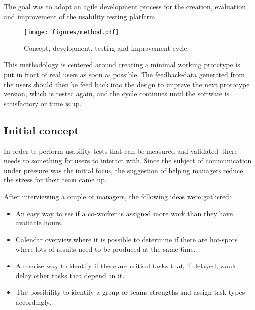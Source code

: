 \documentclass[nofilelist,dvipsnames]{cslthse-msc}
\begin{document}
        The goal was to adopt an agile development process{\findref} for the
        creation, evaluation and improvement of the usability testing platform.

        \begin{figure}[h!]
          \centering
          \texttt{[image: figures/method.pdf]}
          \caption{Concept, development, testing and improvement cycle.}
        \end{figure}

        This methodology is centered around creating a minimal
        working prototype{\findref} is put in front of real users as soon as
        possible. The feedback-data generated from the users should then be
        feed back into the design to improve the next prototype version, which
        is tested again, and the cycle continues until the software is
        satisfactory or time is up.


      \subsection{Initial concept}

        In order to perform usability tests that can be measured and validated,
        there needs to something for users to interact with. Since the subject
        of communication under pressure was the initial focus, the suggestion
        of helping managers reduce the stress for their team came up.

        After interviewing a couple of managers, the following ideas were
        gathered:

        \begin{itemize}
          \item{
            An easy way to see if a co-worker is assigned more work than they
            have available hours.
          }
          \item{
            Calendar overview where it is possible to determine if there are
            hot-spots where lots of results need to be produced at the same
            time.
          }
          \item{
            A concise way to identify if there are critical tasks that, if
            delayed, would delay other tasks that depend on it.
          }
          \item{
            The possibility to identify a group or teams strengths and assign
            task types accordingly.
          }
        \end{itemize}
\end{document}
